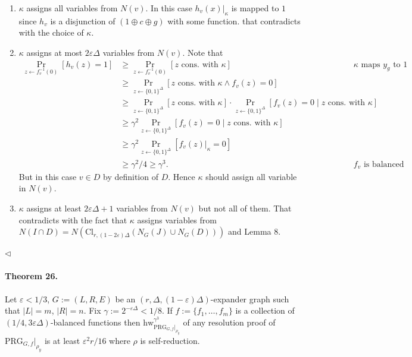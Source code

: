 \begin{enumerate}
\item $\kappa$ assigns all variables from $N(v)$. In this case $h_v(x)|_\kappa$ is mapped to $1$ since $h_v$ is a disjunction of $(1\oplus c\oplus g)$ with some function. that contradicts with the choice of $\kappa$.
\item $\kappa$ assigns at most $2\varepsilon\Delta$ variables from $N(v)$. Note that
\begin{align*}
\Pr_{z\leftarrow f_v^{-1}(0)}[h_v(z)=1]&\geq\Pr_{z\leftarrow f_v^{-1}(0)}[z\text{ cons. with }\kappa]&&\kappa\text{ maps }y_g\text{ to }1\\
&\geq\Pr_{z\leftarrow\{0,1\}^\Delta}[z\text{ cons. with }\kappa\wedge f_v(z)=0]\\
&\geq\Pr_{z\leftarrow\{0,1\}^\Delta}[z\text{ cons. with }\kappa]\cdot\Pr_{z\leftarrow\{0,1\}^\Delta}[f_v(z)=0\mid z\text{ cons. with }\kappa]\\
&\geq\gamma^2\Pr_{z\leftarrow\{0,1\}^\Delta}[f_v(z)=0\mid z\text{ cons. with }\kappa]\\
&\geq\gamma^2\Pr_{z\leftarrow\{0,1\}^\Delta}[f_v(z)|_\kappa=0]\\
&\geq\gamma^2/4\geq\gamma^3.&&f_v\text{ is balanced}
\end{align*}
But in this case $v\in D$ by definition of $D$. Hence $\kappa$ should assign all variable in $N(v)$.
\item $\kappa$ assigns at least $2\varepsilon\Delta+1$ variables from $N(v)$ but not all of them. That contradicts with the fact that $\kappa$ assigns variables from $N(I\cap D)=N(\mathrm{Cl}_{r,(1-2\varepsilon)\Delta}(N_G(J)\cup N_G(D)))$ and Lemma 8.
\end{enumerate}\hfill$\triangleleft$
\paragraph{Theorem 26.} Let $\varepsilon<1/3$, $G:=(L,R,E)$ be an $(r,\Delta,(1-\varepsilon)\Delta)$-expander graph such that $|L|=m$, $|R|=n$. Fix $\gamma:=2^{-\varepsilon\Delta}<1/8$. If $f:=\{f_1,\ldots,f_m\}$ is a collection of $(1/4,3\varepsilon\Delta)$-balanced functions then $\mathrm{hw}_{\mathrm{PRG}_{G,f}|_{\rho_y}}^{\gamma^3}$ of any resolution proof of $\mathrm{PRG}_{G,f}|_{\rho_y}$ is at least $\varepsilon^2r/16$ where $\rho$ is self-reduction.
